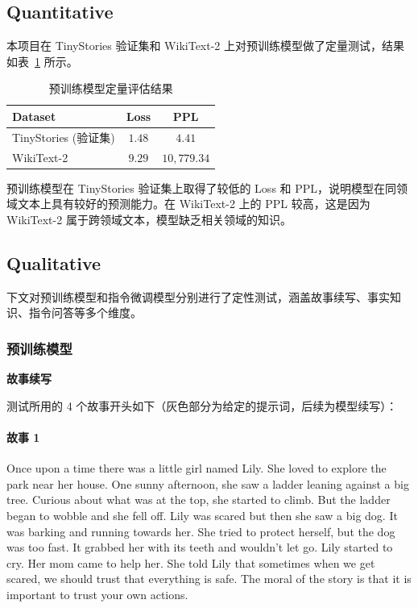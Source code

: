\documentclass{article}
\begin{document}
\subsection{Quantitative}

本项目在 TinyStories 验证集和 WikiText-2 上对预训练模型做了定量测试，结果如表~\ref{tab:quantitative} 所示。

\begin{table}[htbp]
  \centering
  \caption{预训练模型定量评估结果}
  \label{tab:quantitative}
  \begin{tabular}{lcc}
    \toprule
    Dataset & Loss & PPL \\
    \midrule
    TinyStories (验证集) & $1.48$ & $4.41$ \\
    WikiText-2 & $9.29$ & $10{,}779.34$ \\
    \bottomrule
  \end{tabular}
\end{table}

预训练模型在 TinyStories 验证集上取得了较低的 Loss 和 PPL，说明模型在同领域文本上具有较好的预测能力。在 WikiText-2 上的 PPL 较高，这是因为 WikiText-2 属于跨领域文本，模型缺乏相关领域的知识。

\subsection{Qualitative}

下文对预训练模型和指令微调模型分别进行了定性测试，涵盖故事续写、事实知识、指令问答等多个维度。

\subsubsection{预训练模型}

\textbf{故事续写}

测试所用的 4 个故事开头如下（灰色部分为给定的提示词，后续为模型续写）：

\paragraph{故事 1}
\textcolor{gray!60}{Once upon a time there was a little girl named Lily. She loved to explore the park near her house. One sunny afternoon, she saw a ladder leaning against a big tree. Curious about what was at the top, she started to climb. But the ladder began to wobble} and she fell off. Lily was scared but then she saw a big dog. It was barking and running towards her. She tried to protect herself, but the dog was too fast. It grabbed her with its teeth and wouldn't let go. Lily started to cry. Her mom came to help her. She told Lily that sometimes when we get scared, we should trust that everything is safe. The moral of the story is that it is important to trust your own actions.
\end{document}
